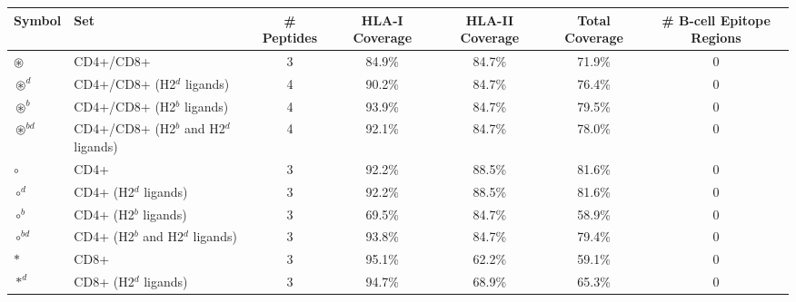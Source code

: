 \begin{tabular}{llccccc}
\toprule
                                              Symbol &                                      Set &  \# Peptides & HLA-I Coverage & HLA-II Coverage & Total Coverage &  \# B-cell Epitope Regions \\
\midrule
                                     $ \circledast $ &                                CD4+/CD8+ &            3 &         84.9\% &          84.7\% &         71.9\% &                          0 \\
                                   $ \circledast^d $ &               CD4+/CD8+ (H2$^d$ ligands) &            4 &         90.2\% &          84.7\% &         76.4\% &                          0 \\
                                   $ \circledast^b $ &               CD4+/CD8+ (H2$^b$ ligands) &            4 &         93.9\% &          84.7\% &         79.5\% &                          0 \\
                                $ \circledast^{bd} $ &    CD4+/CD8+ (H2$^b$ and H2$^d$ ligands) &            4 &         92.1\% &          84.7\% &         78.0\% &                          0 \\
                                           $ \circ $ &                                     CD4+ &            3 &         92.2\% &          88.5\% &         81.6\% &                          0 \\
                                         $ \circ^d $ &                    CD4+ (H2$^d$ ligands) &            3 &         92.2\% &          88.5\% &         81.6\% &                          0 \\
                                         $ \circ^b $ &                    CD4+ (H2$^b$ ligands) &            3 &         69.5\% &          84.7\% &         58.9\% &                          0 \\
                                      $ \circ^{bd} $ &         CD4+ (H2$^b$ and H2$^d$ ligands) &            3 &         93.8\% &          84.7\% &         79.4\% &                          0 \\
                                            $ \ast $ &                                     CD8+ &            3 &         95.1\% &          62.2\% &         59.1\% &                          0 \\
                                          $ \ast^d $ &                    CD8+ (H2$^d$ ligands) &            3 &         94.7\% &          68.9\% &         65.3\% &                          0 \\

\end{tabular}

